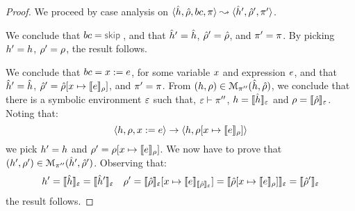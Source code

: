 \begin{proof}
We proceed by case analysis on $\symbtrans{\sheap, \sstore, \bcmd, \pc}{\sheap', \sstore', \pc'}$. 
\vspace{5pt}

\noindent{} 
We conclude that $\bcmd = \jsilskip$, and 
that $\sheap' = \sheap$, $\sstore' = \sstore$, and $\pc' = \pc$. 
By picking $\heap' = \heap$, $\store' = \store$, the result follows. 
\vspace{6pt}

\noindent{} 
We conclude that $\bcmd = \jvar := \jsilexpr$, for some variable $\jvar$ and expression $\jsilexpr$, 
and that $\sheap' = \sheap$, $\sstore' = \sstore[\jvar \mapsto \symbeval{\jsilexpr}{\store}]$, and $\pc' = \pc$. 
From $(\heap, \store) \in \smodels{\sheap, \sstore}{\pc''}$, we conclude that there is a symbolic environment 
$\senv$ such that, $\senv \vdash \pc''$,  $\heap = \semexpr{\sheap}{\senv}$ and $\store = \semexpr{\sstore}{\senv}$. 
Noting that: 
$$
 \semtrans{\heap, \store, \jvar := \jsilexpr}{\heap, \store[\jvar \mapsto \symbeval{\jsilexpr}{\store}]}
$$
we pick $\heap' = \heap$ and $\store' =  \store[\jvar \mapsto \symbeval{\jsilexpr}{\store}]$. We 
now have to prove that $(\heap', \store') \in \smodels{\sheap', \sstore'}{\pc''}$.
Observing that: 
$$
\heap' =  \semexpr{\sheap}{\senv} = \semexpr{\sheap'}{\senv} 
\quad 
\store' = \semexpr{\sstore}{\senv}[\jvar \mapsto \symbeval{\jsilexpr}{\semexpr{\sstore}{\senv}}]
   = \semexpr{\sstore[\jvar \mapsto \symbeval{\jsilexpr}{\store}]}{\senv} 
   = \semexpr{\sstore'}{\senv}
$$
%
the result follows. 
\vspace{6pt}


\end{proof}

